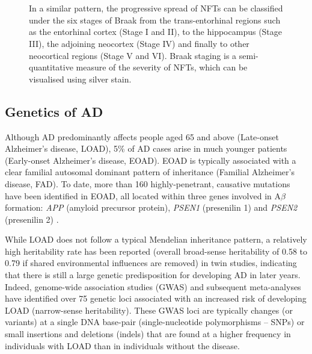 \begin{figure}[!htp]
{	\\
	\\
	In a similar pattern, the progressive spread of NFTs can be classified under the six stages of Braak from the trans-entorhinal regions such as the entorhinal cortex (Stage I and II), to the hippocampus (Stage III), the adjoining neocortex (Stage IV) and finally to other neocortical regions (Stage V and VI)\cite{H1991}. Braak staging is a semi-quantitative measure of the severity of NFTs, which can be visualised using silver stain. 
	}
	\label{fig:AD_development}
\end{figure}

\newpage
\subsection{Genetics of AD}
\label{Genetics_of_AD}
Although AD predominantly affects people aged 65 and above (Late-onset Alzheimer’s disease, LOAD), 5\% of AD cases arise in much younger patients (Early-onset Alzheimer’s disease, EOAD). EOAD is typically associated with a clear familial autosomal dominant pattern of inheritance (Familial Alzheimer’s disease, FAD)\cite{Jarmolowicz2015}. To date, more than 160 highly-penetrant, causative mutations have been identified in EOAD, all located within three genes involved in A$\beta$ formation: \textit{APP} (amyloid precursor protein), \textit{PSEN1} (presenilin 1) and \textit{PSEN2} (presenilin 2) \cite{LM2010,Chai2007}. %

While LOAD does not follow a typical Mendelian inheritance pattern, a relatively high heritability rate has been reported (overall broad-sense heritability of 0.58 to 0.79 if shared environmental influences are removed\cite{Gatz2006}) in twin studies, indicating that there is still a large genetic predisposition for developing AD in later years. Indeed, genome-wide association studies (GWAS) and subsequent meta-analyses \cite{Bellenguez2020,Naj2020,Kunkle2019,Jansen2019,Lambert2013,Naj2011,Hollingworth2011,Harold2009,Lambert2009,Bertram2008} have identified over 75 genetic loci associated with an increased risk of developing LOAD (narrow-sense heritability). These GWAS loci are typically changes (or variants) at a single DNA base-pair (single-nucleotide polymorphisms – SNPs) or small insertions and deletions (indels) that are found at a higher frequency in individuals with LOAD than in individuals without the disease. 

